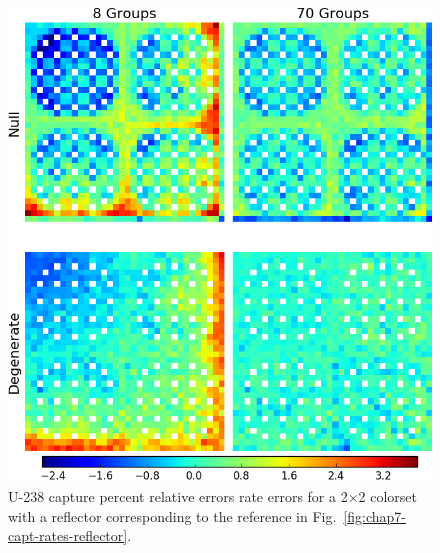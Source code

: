 \begin{figure}[h!]
\centering
\includegraphics[width=\linewidth]{figures/quantification/reflector/capt-err}
\vspace{2mm}
\caption[U-238 capture rate errors for a 2$\times$2 colorset with a reflector]{U-238 capture percent relative errors rate errors for a 2$\times$2 colorset with a reflector corresponding to the reference in Fig.~\ref{fig:chap7-capt-rates-reflector}.}
\label{fig:chap8-reflector-capt-err}
\end{figure}

\clearpage



